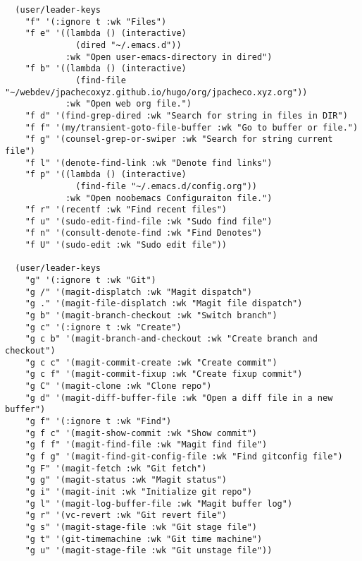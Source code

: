 \documentclass[11pt]{article}
\begin{document}
\begin{verbatim}
  (user/leader-keys
    "f" '(:ignore t :wk "Files")    
    "f e" '((lambda () (interactive)
              (dired "~/.emacs.d")) 
            :wk "Open user-emacs-directory in dired")
    "f b" '((lambda () (interactive)
              (find-file "~/webdev/jpachecoxyz.github.io/hugo/org/jpacheco.xyz.org")) 
            :wk "Open web org file.")
    "f d" '(find-grep-dired :wk "Search for string in files in DIR")
    "f f" '(my/transient-goto-file-buffer :wk "Go to buffer or file.")
    "f g" '(counsel-grep-or-swiper :wk "Search for string current file")
    "f l" '(denote-find-link :wk "Denote find links")
    "f p" '((lambda () (interactive)
              (find-file "~/.emacs.d/config.org")) 
            :wk "Open noobemacs Configuraiton file.")
    "f r" '(recentf :wk "Find recent files")
    "f u" '(sudo-edit-find-file :wk "Sudo find file")
    "f n" '(consult-denote-find :wk "Find Denotes")
    "f U" '(sudo-edit :wk "Sudo edit file"))

  (user/leader-keys
    "g" '(:ignore t :wk "Git")    
    "g /" '(magit-displatch :wk "Magit dispatch")
    "g ." '(magit-file-displatch :wk "Magit file dispatch")
    "g b" '(magit-branch-checkout :wk "Switch branch")
    "g c" '(:ignore t :wk "Create") 
    "g c b" '(magit-branch-and-checkout :wk "Create branch and checkout")
    "g c c" '(magit-commit-create :wk "Create commit")
    "g c f" '(magit-commit-fixup :wk "Create fixup commit")
    "g C" '(magit-clone :wk "Clone repo")
    "g d" '(magit-diff-buffer-file :wk "Open a diff file in a new buffer")
    "g f" '(:ignore t :wk "Find") 
    "g f c" '(magit-show-commit :wk "Show commit")
    "g f f" '(magit-find-file :wk "Magit find file")
    "g f g" '(magit-find-git-config-file :wk "Find gitconfig file")
    "g F" '(magit-fetch :wk "Git fetch")
    "g g" '(magit-status :wk "Magit status")
    "g i" '(magit-init :wk "Initialize git repo")
    "g l" '(magit-log-buffer-file :wk "Magit buffer log")
    "g r" '(vc-revert :wk "Git revert file")
    "g s" '(magit-stage-file :wk "Git stage file")
    "g t" '(git-timemachine :wk "Git time machine")
    "g u" '(magit-stage-file :wk "Git unstage file"))


\end{verbatim}
\end{document}
